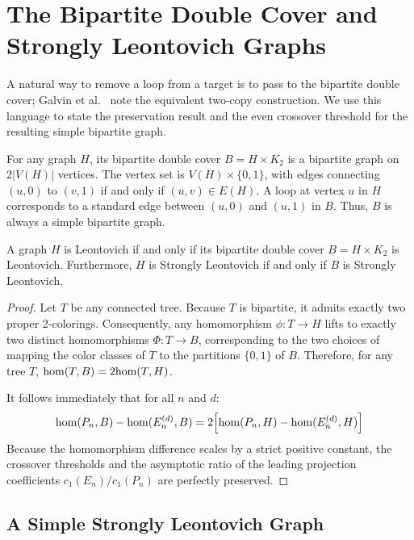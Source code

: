 \section{The Bipartite Double Cover and Strongly Leontovich Graphs}
\label{sec:doublecover}

A natural way to remove a loop from a target is to pass to the
bipartite double cover; Galvin et al.~\cite{galvin2026} note the
equivalent two-copy construction. We use this language to state the
preservation result and the even crossover threshold for the resulting
simple bipartite graph.

\begin{definition}
For any graph $H$, its bipartite double cover $B = H \times K_2$ is a
bipartite graph on $2|V(H)|$ vertices. The vertex set is $V(H) \times \{0, 1\}$,
with edges connecting $(u, 0)$ to $(v, 1)$ if and only if $(u, v) \in E(H)$.
A loop at vertex $u$ in $H$ corresponds to a standard edge between $(u, 0)$ and
$(u, 1)$ in $B$. Thus, $B$ is always a simple bipartite graph.
\end{definition}

\begin{theorem}
\label{thm:double_cover}
A graph $H$ is Leontovich if and only if its bipartite double cover $B = H
\times K_2$ is Leontovich. Furthermore, $H$ is Strongly Leontovich if and only
if $B$ is Strongly Leontovich.
\end{theorem}
\begin{proof}
Let $T$ be any connected tree. Because $T$ is bipartite, it admits exactly two
proper 2-colorings. Consequently, any homomorphism $\phi \colon T \to H$ lifts
to exactly two distinct homomorphisms $\Phi \colon T \to B$, corresponding to
the two choices of mapping the color classes of $T$ to the partitions $\{0, 1\}$
of $B$. Therefore, for any tree $T$, $\mathrm{hom}(T, B) = 2 \mathrm{hom}(T, H)$.

It follows immediately that for all $n$ and $d$:
\[
  \mathrm{hom}(P_n, B) - \mathrm{hom}(E_n^{(d)}, B) = 2 \Bigl[ \mathrm{hom}(P_n, H) - \mathrm{hom}(E_n^{(d)}, H) \Bigr]
\]
Because the homomorphism difference scales by a strict positive constant, the
crossover thresholds and the asymptotic ratio of the leading projection
coefficients $c_1(E_n)/c_1(P_n)$ are perfectly preserved.
\end{proof}

\subsection{A Simple Strongly Leontovich Graph}


